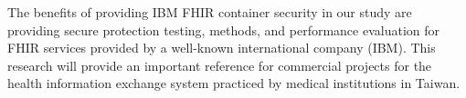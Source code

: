 The benefits of providing IBM FHIR container security in our study are providing
secure protection testing, methods, and performance evaluation for FHIR services provided by
a well-known international company (IBM). This research will provide an important reference for
commercial projects for the health information exchange system practiced by medical
institutions in Taiwan.

